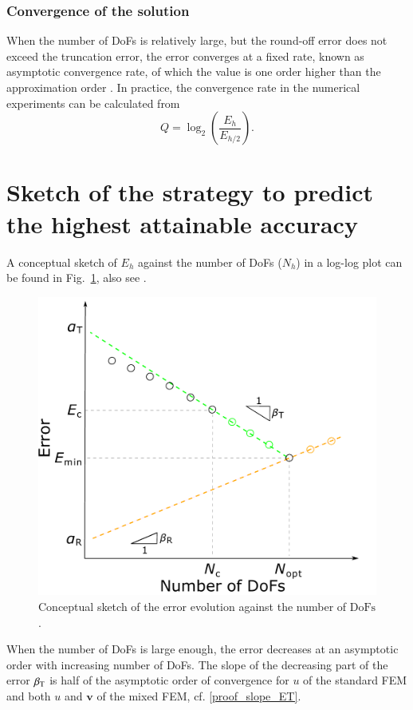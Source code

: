 \documentclass[review,3p]{elsarticle}
\begin{document}
\subsubsection{Convergence of the solution}
When the number of DoFs is relatively large, but the round-off error does not exceed the truncation error, the error converges at a fixed rate, known as asymptotic convergence rate, of which the value is one order higher than the approximation order \cite{gockenbach2006understanding}. In practice, the convergence rate in the numerical experiments can be calculated from 
\begin{equation}
  Q=\log _2 \left( \frac{E_{h}}{E_{h/2}} \right).  \label{formula_order_of_convergence_analytical_solution}
\end{equation}

\section{Sketch of the strategy to predict the highest attainable accuracy}      \label{section_error_evolution_and_prediction}

A conceptual sketch of $E_h$ against the number of DoFs ($N_h$) in a log-log plot can be found in Fig.~\ref{error_evolution_one_p}, also see \cite{butcher2016numerical}.

\begin{figure}[!ht]
\centering
   \includegraphics[width=0.5\linewidth]{../../3_1d_or_2d/3_figure/1_error_evolution_one_p/sketch_error_one_p.pdf}
   \caption{Conceptual sketch of the error evolution against the number of $\text{DoFs}$.}
   \label{error_evolution_one_p}
\end{figure}

When the number of DoFs is large enough, the error decreases at an asymptotic order with increasing number of DoFs.
The slope of the decreasing part of the error $\beta_{\rm T}$ is half of the asymptotic order of convergence for $u$ of the standard FEM and both $u$ and $\mathbf{v}$ of the mixed FEM, cf. \ref{proof_slope_ET}.
\end{document}
